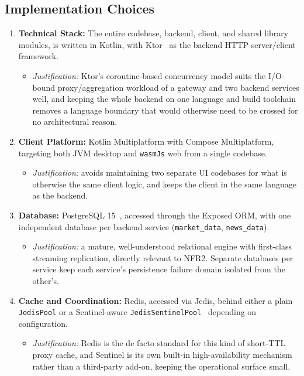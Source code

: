 \documentclass{scrartcl}
\begin{document}
\subsection{Implementation Choices}\label{implementation-choices}

\begin{enumerate}
  \item \textbf{Technical Stack:} The entire codebase, backend, client, and shared library
  modules, is written in Kotlin, with Ktor~\citep{ktor2024docs} as the backend HTTP
  server/client framework.
  \begin{itemize}
    \item \emph{Justification:} Ktor's coroutine-based concurrency model suits the I/O-bound
    proxy/aggregation workload of a gateway and two backend services well, and keeping the whole
    backend on one language and build toolchain removes a language boundary that would otherwise
    need to be crossed for no architectural reason.
  \end{itemize}

  \item \textbf{Client Platform:} Kotlin Multiplatform with Compose Multiplatform, targeting both
  JVM desktop and \texttt{wasmJs} web from a single codebase.
  \begin{itemize}
    \item \emph{Justification:} avoids maintaining two separate UI codebases for what is
    otherwise the same client logic, and keeps the client in the same language as the backend.
  \end{itemize}

  \item \textbf{Database:} PostgreSQL 15~\citep{postgresql2024docs}, accessed through the Exposed
  ORM, with one independent database per backend service (\texttt{market\_data},
  \texttt{news\_data}).
  \begin{itemize}
    \item \emph{Justification:} a mature, well-understood relational engine with first-class
    streaming replication, directly relevant to NFR2. Separate databases per service keep each
    service's persistence failure domain isolated from the other's.
  \end{itemize}

  \item \textbf{Cache and Coordination:} Redis, accessed via Jedis, behind either a plain
  \texttt{JedisPool} or a Sentinel-aware \texttt{JedisSentinelPool}~\citep{redis2024sentinel}
  depending on configuration.
  \begin{itemize}
    \item \emph{Justification:} Redis is the de facto standard for this kind of short-TTL proxy
    cache, and Sentinel is its own built-in high-availability mechanism rather than a
    third-party add-on, keeping the operational surface small.
  \end{itemize}


\end{enumerate}
\end{document}
